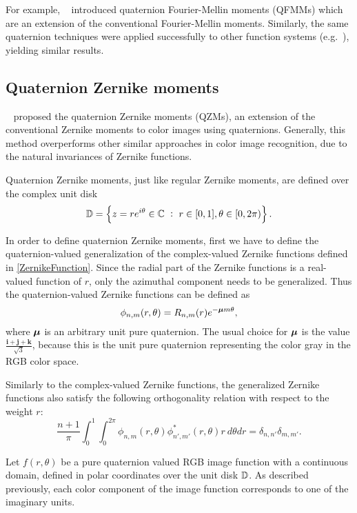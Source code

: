 For example, \citeauthor{qfmm}~\cite{qfmm} introduced quaternion Fourier-Mellin moments (QFMMs) which are an extension of the conventional Fourier-Mellin moments. Similarly, the same quaternion techniques were applied successfully to other function systems (e.g.~\cite{Shao, chebyshev-fourier}), yielding similar results.

\subsection{Quaternion Zernike moments}\label{sec:qzm}
\citeauthor{qzm}~\cite{qzm,qzmi} proposed the quaternion Zernike moments (QZMs), an extension of the conventional Zernike moments to color images using quaternions. Generally, this method overperforms other similar approaches in color image recognition, due to the natural invariances of Zernike functions.


Quaternion Zernike moments, just like regular Zernike moments, are defined over the complex unit disk
\[
	\D = \left\{ z = re^{i\theta}\in\C \ :\ r\in[0,1],\theta\in[0,2\pi)\right\}.
\]


In order to define quaternion Zernike moments, first we have to define the quaternion-valued generalization of the complex-valued Zernike functions defined in \eqref{ZernikeFunction}. Since the radial part of the Zernike functions is a real-valued function of $r$, only the azimuthal component needs to be generalized. Thus the quaternion-valued Zernike functions can be defined as
\[
	\phi_{n,m}(r,\theta) = R_{n,m}(r) e^{-\boldsymbol{\mu} m\theta},
\]
where $\boldsymbol{\mu}$ is an arbitrary unit pure quaternion. The usual choice for $\boldsymbol{\mu}$ is the value $\frac{\mathbf{i} + \mathbf{j} + \mathbf{k}}{\sqrt{3}}$, because this is the unit pure quaternion representing the color gray in the RGB color space.

Similarly to the complex-valued Zernike functions, the generalized Zernike functions also satisfy the following orthogonality relation with respect to the weight $r$:
\begin{equation}\label{QZortho}
	\frac{n+1}{\pi} \int_0^1 \int_0^{2\pi} \phi_{n,m}(r,\theta) \phi^*_{n',m'}(r,\theta) r \ d\theta dr = \delta_{n,n'}\delta_{m,m'}.
\end{equation}


Let $f(r,\theta)$ be a pure quaternion valued RGB image function with a continuous domain, defined in polar coordinates over the unit disk $\mathbb{D}$. As described previously, each color component of the image function corresponds to one of the imaginary units.


